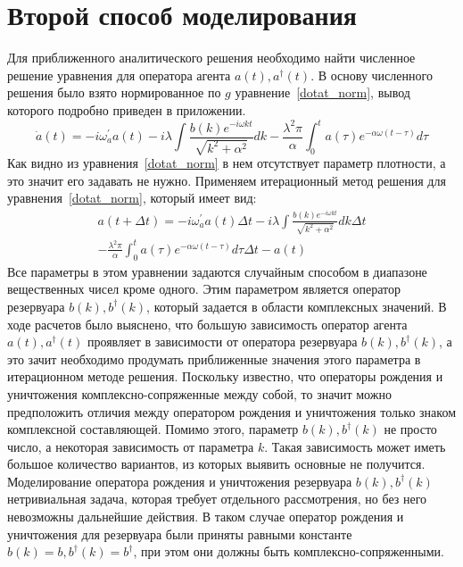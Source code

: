 \section{Второй способ моделирования}

Для приближенного аналитического решения необходимо найти численное решение уравнения для оператора
агента $a(t), a^{\dagger}(t)$.
В основу численного решения было взято нормированное по $g$ уравнение~\eqref{dotat_norm}, вывод которого
подробно приведен в приложении.
\begin{equation}\label{dotat_norm}
    \dot{a}(t) =
    -i \omega^{'}_{a} a(t)
    -i \lambda \int \frac{b(k)e^{-i \omega k t}}{\sqrt{k^{2} + \alpha^2}} dk
    -\frac{\lambda^{2} \pi}{\alpha} \int_{0}^{t} a(\tau) e^{- \alpha \omega (t - \tau)} d\tau
\end{equation}
Как видно из уравнения~\eqref{dotat_norm} в нем отсутствует параметр плотности, а это значит его
задавать не нужно.
Применяем итерационный метод решения для уравнения~\eqref{dotat_norm}, который имеет вид:
\begin{multline}
    a(t + \Delta t) =
    -i \omega^{'}_{a} a(t) \Delta t
    -i \lambda \int \frac{b(k)e^{-i \omega k t}}{\sqrt{k^{2} + \alpha^2}} dk \Delta t \\
    -\frac{\lambda^{2} \pi}{\alpha} \int_{0}^{t} a(\tau) e^{- \alpha \omega (t - \tau)} d\tau \Delta t
    - a(t)
\end{multline}
Все параметры в этом уравнении задаются случайным способом в диапазоне вещественных чисел кроме одного.
Этим параметром является оператор резервуара $b(k), b^{\dagger}(k)$, который задается в области
комплексных значений.
В ходе расчетов было выяснено, что большую зависимость оператор агента $a(t), a^{\dagger}(t)$ проявляет
в зависимости от оператора резервуара $b(k), b^{\dagger}(k)$, а это зачит необходимо продумать
приближенные значения этого параметра в итерационном методе решения.
Поскольку известно, что операторы рождения и уничтожения комплексно-сопряженные между собой, то значит
можно предположить отличия между оператором рождения и уничтожения только знаком комплексной составляющей.
Помимо этого, параметр $b(k), b^{\dagger}(k)$ не просто число, а некоторая зависимость от параметра $k$.
Такая зависимость может иметь большое количество вариантов, из которых выявить основные не получится.
Моделирование оператора рождения и уничтожения резервуара $b(k), b^{\dagger}(k)$ нетривиальная задача,
которая требует отдельного рассмотрения, но без него невозможны дальнейшие действия.
В таком случае оператор рождения и уничтожения для резервуара были приняты равными константе
$b(k) = b, b^{\dagger}(k) = b^{\dagger}$, при этом они должны быть комплексно-сопряженными.

